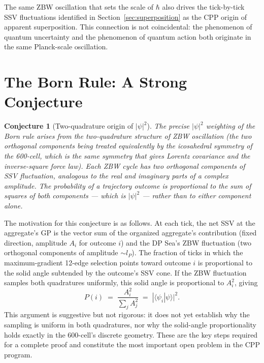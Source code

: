 \documentclass[12pt]{article}
\newtheorem{conjecture}[theorem]{Conjecture}
\newcommand{\lP}{l_P}
\begin{document}
The same ZBW oscillation that sets the scale of $\hbar$ also drives the
tick-by-tick SSV fluctuations identified in Section~\ref{sec:superposition}
as the CPP origin of apparent superposition.  This connection is not
coincidental: the phenomenon of quantum uncertainty and the phenomenon of
quantum action both originate in the same Planck-scale oscillation.

\section{The Born Rule: A Strong Conjecture}
\label{sec:born}

\begin{conjecture}[Two-quadrature origin of $|\psi|^2$]
\label{conj:born}
The precise $|\psi|^2$ weighting of the Born rule arises from the
two-quadrature structure of ZBW oscillation (the two orthogonal components
being treated equivalently by the icosahedral symmetry of the 600-cell,
which is the same symmetry that gives Lorentz covariance and the
inverse-square force law).  Each ZBW cycle has two orthogonal components of
SSV fluctuation, analogous to the real and imaginary parts of a complex
amplitude.  The probability of a trajectory outcome is proportional to the
sum of squares of both components --- which is $|\psi|^2$ --- rather than
to either component alone.
\end{conjecture}

The motivation for this conjecture is as follows.  At each tick, the net SSV
at the aggregate's GP is the vector sum of the organized aggregate's
contribution (fixed direction, amplitude $A_i$ for outcome $i$) and the DP
Sea's ZBW fluctuation (two orthogonal components of amplitude $\sim\lP$).
The fraction of ticks in which the maximum-gradient 12-edge selection points
toward outcome $i$ is proportional to the solid angle subtended by the
outcome's SSV cone.  If the ZBW fluctuation samples both quadratures
uniformly, this solid angle is proportional to $A_i^2$, giving
\begin{equation}
  P(i) \;=\; \frac{A_i^2}{\sum_j A_j^2}
  \;=\; |\langle\psi_i|\psi\rangle|^2.
  \label{eq:born}
\end{equation}
This argument is suggestive but not rigorous: it does not yet establish why
the sampling is uniform in both quadratures, nor why the solid-angle
proportionality holds exactly in the 600-cell's discrete geometry.  These
are the key steps required for a complete proof and constitute the most
important open problem in the CPP program.
\end{document}
